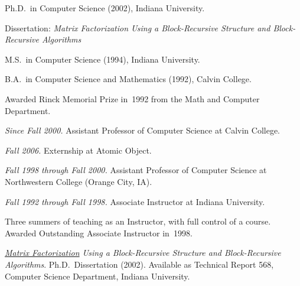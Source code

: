 \documentclass[ComputerScience]{vita}
\begin{document}
\begin{vita}



\begin{Degrees}
\item Ph.D.\ in Computer Science (2002), Indiana University. \par
  {
    Dissertation: \textit{Matrix Factorization Using a Block-Recursive
    Structure and Block-Recursive Algorithms}
	}
	\item M.S.\ in Computer Science (1994), Indiana University.
  \item B.A.\ in Computer Science and Mathematics (1992), Calvin College. \par
	{
	  Awarded Rinck Memorial Prize in~1992 from the Math and Computer Department.
  }
\end{Degrees}




\begin{Experience}

\item \emph{Since Fall 2000.}  Assistant Professor of Computer Science at Calvin College. \par
  {
    \emph{Fall 2006.}  Externship at Atomic Object.
  }

\item \emph{Fall 1998 through Fall 2000.}  Assistant Professor of Computer Science at Northwestern College (Orange City, IA).

\item \emph{Fall 1992 through Fall 1998.}  Associate Instructor at Indiana University.\par
	{
		Three summers of teaching as an Instructor, with full control of a course.  Awarded Outstanding Associate Instructor in~1998.
	}

\end{Experience}

\newpage


\begin{Publications}

  \item \textit{\href{http://www.cs.indiana.edu/Research/techreports/TR568.shtml}{Matrix Factorization} Using a Block-Recursive Structure and Block-Recursive Algorithms}.  Ph.D.\ Dissertation (2002).  Available as Technical Report 568, Computer Science Department, Indiana University.


\end{Publications}
\end{vita}
\end{document}
